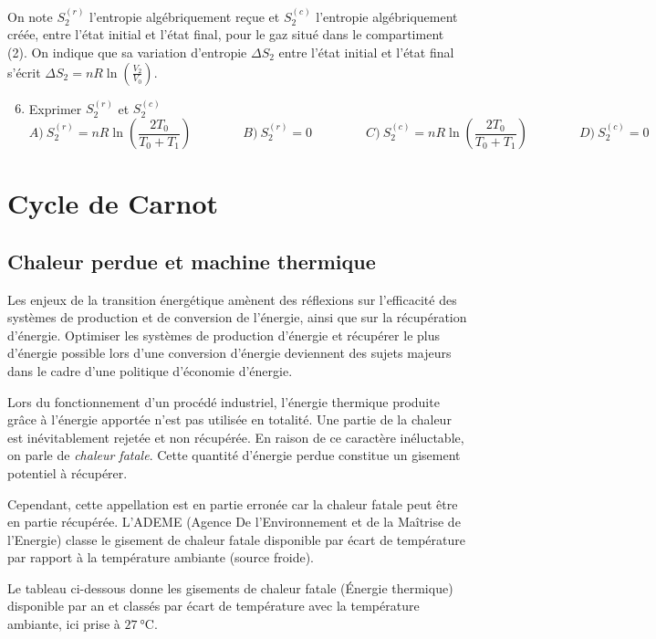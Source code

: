 \documentclass[a4paper, 12pt, garamond]{book}
\begin{document}
On note \(S_2^{(r)}\) l'entropie algébriquement reçue et \(S_2^{(c)}\)
l'entropie algébriquement créée, entre l'état initial et l'état final,
pour le gaz situé dans le compartiment (2). On indique que sa variation
d'entropie \(\Delta S_2\) entre l'état initial et l'état final s'écrit
\(\Delta S_2 = nR \ln\left(\frac{V_2}{V_0}\right)\).

\begin{enumerate}
	\setcounter{enumi}{5}
	\item
	      Exprimer \(S_2^{(r)}\) et \(S_2^{(c)}\)
	      \[ A) \ S_2^{(r)} = nR\ln\left(\frac{2T_0}{T_0 + T_1}\right) \qquad\qquad B) \ S_2^{(r)} = 0 \ \qquad\qquad C) \ S_2^{(c)} = nR\ln\left(\frac{2T_0}{T_0 + T_1}\right) \qquad\qquad D) \ S_2^{(c)} = 0\]
\end{enumerate}

\section{Cycle de Carnot}

\subsection{Chaleur perdue et machine thermique}

Les enjeux de la transition énergétique amènent des réflexions sur
l'efficacité des systèmes de production et de conversion de l'énergie,
ainsi que sur la récupération d'énergie. Optimiser les systèmes de
production d'énergie et récupérer le plus d'énergie possible lors d'une
conversion d'énergie deviennent des sujets majeurs dans le cadre d'une
politique d'économie d'énergie.

Lors du fonctionnement d'un procédé industriel, l'énergie thermique
produite grâce à l'énergie apportée n'est pas utilisée en totalité. Une
partie de la chaleur est inévitablement rejetée et non récupérée. En
raison de ce caractère inéluctable, on parle de \emph{chaleur fatale}.
Cette quantité d'énergie perdue constitue un gisement potentiel à
récupérer.

Cependant, cette appellation est en partie erronée car la chaleur fatale
peut être en partie récupérée. L'ADEME (Agence De l'Environnement et de
la Maîtrise de l'Energie) classe le gisement de chaleur fatale
disponible par écart de température par rapport à la température
ambiante (source froide).

Le tableau ci-dessous donne les gisements de chaleur fatale (Énergie
thermique) disponible par an et classés par écart de température avec la
température ambiante, ici prise à $\SI{27}{\degreeCelsius}$.
\end{document}
